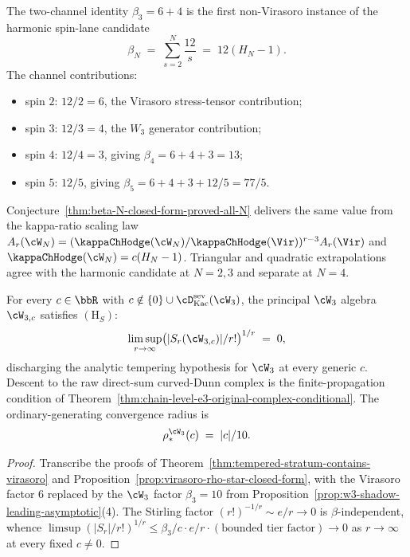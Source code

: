 \begin{remark}
\label{rem:beta-N-first-principles-derivation-path}
The two-channel identity $\beta_3=6+4$ is the first non-Virasoro
instance of the harmonic spin-lane candidate
\[
 \beta_N
 \;=\;
 \sum_{s=2}^{N}\frac{12}{s}
 \;=\;
 12(H_N-1).
\]
The channel contributions:
\begin{itemize}[nosep]
\item spin $2$: $12/2=6$, the Virasoro stress-tensor contribution;
\item spin $3$: $12/3=4$, the $W_3$ generator contribution;
\item spin $4$: $12/4=3$, giving $\beta_4=6+4+3=13$;
\item spin $5$: $12/5$, giving $\beta_5=6+4+3+12/5=77/5$.
\end{itemize}
Conjecture~\ref{thm:beta-N-closed-form-proved-all-N} delivers the
same value from the kappa-ratio scaling law
$A_r(\cW_N)=(\kappaChHodge(\cW_N)/\kappaChHodge(\Vir))^{r-3}A_r(\Vir)$ and
$\kappaChHodge(\cW_N)=c(H_N-1)$. Triangular and quadratic
extrapolations agree with the harmonic candidate at $N=2,3$ and
separate at $N=4$.
\end{remark}

\begin{theorem}
\label{thm:tempered-stratum-contains-w3}
For every $c \in \bbR$ with
$c \notin \{0\} \cup \cD^{\mathrm{sev}}_{\mathrm{Kac}}(\cW_3)$, the
principal $\cW_3$ algebra $\cW_{3, c}$ satisfies $(\mathrm{H}_S)$:
\[
 \limsup_{r \to \infty}
 \bigl( \lvert S_r(\cW_{3, c}) \rvert / r! \bigr)^{1/r}
 \;=\;
 0,
\]
discharging the analytic tempering hypothesis for $\cW_3$ at every
generic $c$. Descent to the raw direct-sum curved-Dunn complex is the
finite-propagation condition of
Theorem~\ref{thm:chain-level-e3-original-complex-conditional}. The
ordinary-generating convergence radius is
\[
 \rho_*^{\cW_3}(c) \;=\; \lvert c \rvert / 10.
\]
\end{theorem}

\begin{proof}
Transcribe the proofs of
Theorem~\ref{thm:tempered-stratum-contains-virasoro} and
Proposition~\ref{prop:virasoro-rho-star-closed-form}, with the
Virasoro factor $6$ replaced by the $\cW_3$ factor $\beta_3 = 10$
from Proposition~\ref{prop:w3-shadow-leading-asymptotic}(4). The
Stirling factor $(r!)^{-1/r} \sim e/r \to 0$ is $\beta$-independent,
whence
$\limsup (|S_r| / r!)^{1/r} \le \beta_3 / c \cdot e/r \cdot (\text{bounded
tier factor}) \to 0$ as $r \to \infty$ at every fixed $c \neq 0$.
\end{proof}

